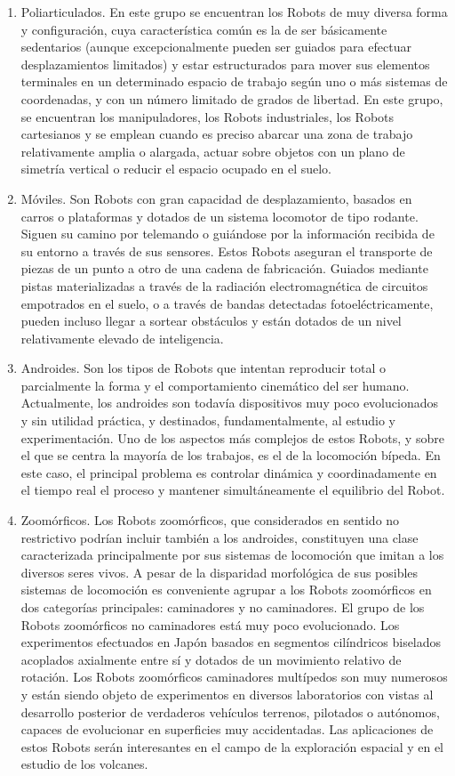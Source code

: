 \begin{enumerate}[1.]
	\item Poliarticulados. En este grupo se encuentran los Robots de muy diversa forma y configuración, cuya característica común es la de ser básicamente sedentarios (aunque excepcionalmente pueden ser guiados para efectuar desplazamientos limitados) y estar estructurados para mover sus elementos terminales en un determinado espacio de trabajo según uno o más sistemas de coordenadas, y con un número limitado de grados de libertad. En este grupo, se encuentran los manipuladores, los Robots industriales, los Robots cartesianos y se emplean cuando es preciso abarcar una zona de trabajo relativamente amplia o alargada, actuar sobre objetos con un plano de simetría vertical o reducir el espacio ocupado en el suelo.
	\item Móviles. Son Robots con gran capacidad de desplazamiento, basados en carros o plataformas y dotados de un sistema locomotor de tipo rodante. Siguen su camino por telemando o guiándose por la información recibida de su entorno a través de sus sensores. Estos Robots aseguran el transporte de piezas de un punto a otro de una cadena de fabricación. Guiados mediante pistas materializadas a través de la radiación electromagnética de circuitos empotrados en el suelo, o a través de bandas detectadas fotoeléctricamente, pueden incluso llegar a sortear obstáculos y están dotados de un nivel relativamente elevado de inteligencia.
	\item Androides. Son los tipos de Robots que intentan reproducir total o parcialmente la forma y el comportamiento cinemático del ser humano. Actualmente, los androides son todavía dispositivos muy poco evolucionados y sin utilidad práctica, y destinados, fundamentalmente, al estudio y experimentación. Uno de los aspectos más complejos de estos Robots, y sobre el que se centra la mayoría de los trabajos, es el de la locomoción bípeda. En este caso, el principal problema es controlar dinámica y coordinadamente en el tiempo real el proceso y mantener simultáneamente el equilibrio del Robot.
	\item Zoomórficos. Los Robots zoomórficos, que considerados en sentido no restrictivo podrían incluir también a los androides, constituyen una clase caracterizada principalmente por sus sistemas de locomoción que imitan a los diversos seres vivos. A pesar de la disparidad morfológica de sus posibles sistemas de locomoción es conveniente agrupar a los Robots zoomórficos en dos categorías principales: caminadores y no caminadores. El grupo de los Robots zoomórficos no caminadores está muy poco evolucionado. Los experimentos efectuados en Japón basados en segmentos cilíndricos biselados acoplados axialmente entre sí y dotados de un movimiento relativo de rotación. Los Robots zoomórficos caminadores multípedos son muy numerosos y están siendo objeto de experimentos en diversos laboratorios con vistas al desarrollo posterior de verdaderos vehículos terrenos, pilotados o autónomos, capaces de evolucionar en superficies muy accidentadas. Las aplicaciones de estos Robots serán interesantes en el campo de la exploración espacial y en el estudio de los volcanes.

\end{enumerate}
